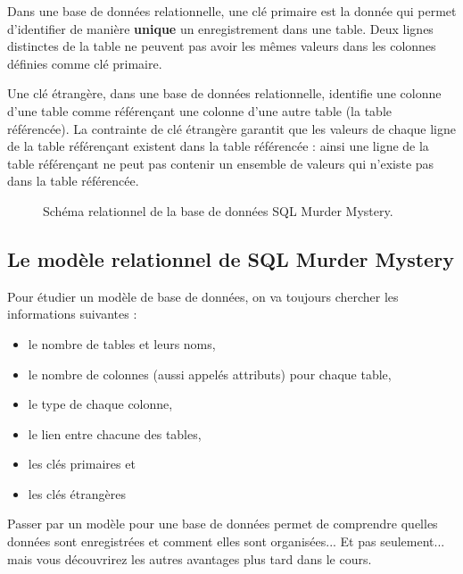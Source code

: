 \begin{Definition}
Dans une base de données relationnelle, une clé primaire est la donnée qui permet d'identifier de manière \textbf{unique} un enregistrement dans une table. Deux lignes distinctes de la table ne peuvent pas avoir les mêmes valeurs dans les colonnes définies comme clé primaire.
\end{Definition}

\begin{Definition}
Une clé étrangère, dans une base de données relationnelle, identifie une colonne d'une table comme référençant une colonne d'une autre table (la table référencée). La contrainte de clé étrangère garantit que les valeurs de chaque ligne de la table référençant existent dans la table référencée : ainsi une ligne de la table référençant ne peut pas contenir un ensemble de valeurs qui n'existe pas dans la table référencée. 
\end{Definition}

\begin{figure}
    \centering
    \resizebox{\linewidth}{!}{}
    \captionsetup{labelformat=empty}
    \caption{Schéma relationnel de la base de données SQL Murder Mystery.}
    \label{fig:SQLmystery-table}
\end{figure}

\subsection*{Le modèle relationnel de SQL Murder Mystery }
Pour étudier un modèle de base de données, on va toujours chercher les informations suivantes :
\begin{itemize}
\item le nombre de tables et leurs noms,
\item le nombre de colonnes (aussi appelés attributs) pour chaque table, 
\item le type de chaque colonne,
\item le lien entre chacune des tables,
\item les clés primaires et
\item les clés étrangères
\end{itemize}

\begin{Comprendre}
    Passer par un modèle pour une base de données permet de comprendre quelles données sont enregistrées et comment elles sont organisées... Et pas seulement... mais vous découvrirez les autres avantages plus tard dans le cours.
\end{Comprendre}

